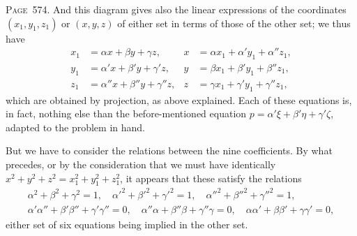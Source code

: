 \documentclass[11pt,a4paper]{book}
\begin{document}
\newpage
\noindent\textsc{Page~574.} And this diagram gives also the linear expressions of the coordinates $(x_1,y_1,z_1)$ or $(x,y,z)$ of either set in terms of those of the other set; we thus have
\begin{align*}
x_1 &= \alpha x + \beta y + \gamma z, & x &= \alpha x_1 + \alpha' y_1 + \alpha'' z_1,\\
y_1 &= \alpha' x + \beta' y + \gamma' z, & y &= \beta x_1 + \beta' y_1 + \beta'' z_1,\\
z_1 &= \alpha'' x + \beta'' y + \gamma'' z, & z &= \gamma x_1 + \gamma' y_1 + \gamma'' z_1,
\end{align*}
which are obtained by projection, as above explained. Each of these equations is, in fact, nothing else than the before-mentioned equation $p=\alpha'\xi+\beta'\eta+\gamma'\zeta$, adapted to the problem in hand.

But we have to consider the relations between the nine coefficients. By what precedes, or by the consideration that we must have identically $x^2+y^2+z^2=x_1^2+y_1^2+z_1^2$, it appears that these satisfy the relations
\begin{gather*}
\alpha^2+\beta^2+\gamma^2=1,\quad \alpha'^2+\beta'^2+\gamma'^2=1,\quad \alpha''^2+\beta''^2+\gamma''^2=1,\\
\alpha'\alpha''+\beta'\beta''+\gamma'\gamma''=0,\quad
\alpha''\alpha+\beta''\beta+\gamma''\gamma=0,\quad
\alpha\alpha'+\beta\beta'+\gamma\gamma'=0,
\end{gather*}
either set of six equations being implied in the other set.
\end{document}
